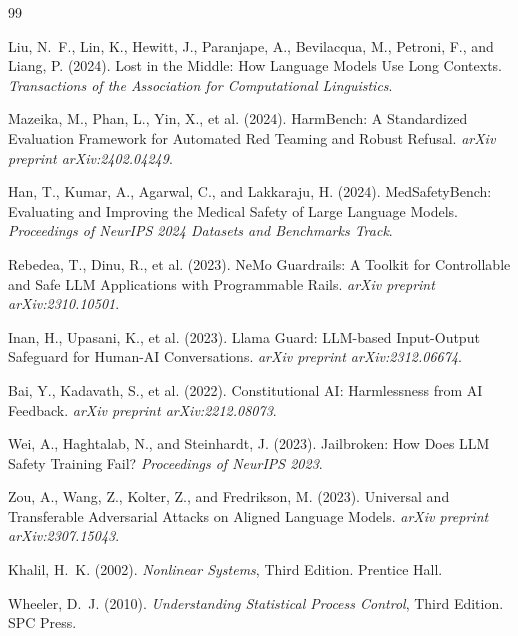 \documentclass[11pt,a4paper]{article}
\begin{document}
\begin{thebibliography}{99}

Liu, N.~F., Lin, K., Hewitt, J., Paranjape, A., Bevilacqua, M., Petroni, F., and Liang, P. (2024).
\newblock Lost in the Middle: How Language Models Use Long Contexts.
\newblock \emph{Transactions of the Association for Computational Linguistics}.

Mazeika, M., Phan, L., Yin, X., et al. (2024).
\newblock HarmBench: A Standardized Evaluation Framework for Automated Red Teaming and Robust Refusal.
\newblock \emph{arXiv preprint arXiv:2402.04249}.

Han, T., Kumar, A., Agarwal, C., and Lakkaraju, H. (2024).
\newblock MedSafetyBench: Evaluating and Improving the Medical Safety of Large Language Models.
\newblock \emph{Proceedings of NeurIPS 2024 Datasets and Benchmarks Track}.

Rebedea, T., Dinu, R., et al. (2023).
\newblock NeMo Guardrails: A Toolkit for Controllable and Safe LLM Applications with Programmable Rails.
\newblock \emph{arXiv preprint arXiv:2310.10501}.

Inan, H., Upasani, K., et al. (2023).
\newblock Llama Guard: LLM-based Input-Output Safeguard for Human-AI Conversations.
\newblock \emph{arXiv preprint arXiv:2312.06674}.

Bai, Y., Kadavath, S., et al. (2022).
\newblock Constitutional AI: Harmlessness from AI Feedback.
\newblock \emph{arXiv preprint arXiv:2212.08073}.

Wei, A., Haghtalab, N., and Steinhardt, J. (2023).
\newblock Jailbroken: How Does LLM Safety Training Fail?
\newblock \emph{Proceedings of NeurIPS 2023}.

Zou, A., Wang, Z., Kolter, Z., and Fredrikson, M. (2023).
\newblock Universal and Transferable Adversarial Attacks on Aligned Language Models.
\newblock \emph{arXiv preprint arXiv:2307.15043}.

Khalil, H.~K. (2002).
\newblock \emph{Nonlinear Systems}, Third Edition.
\newblock Prentice Hall.

Wheeler, D.~J. (2010).
\newblock \emph{Understanding Statistical Process Control}, Third Edition.
\newblock SPC Press.

\end{thebibliography}
\end{document}
